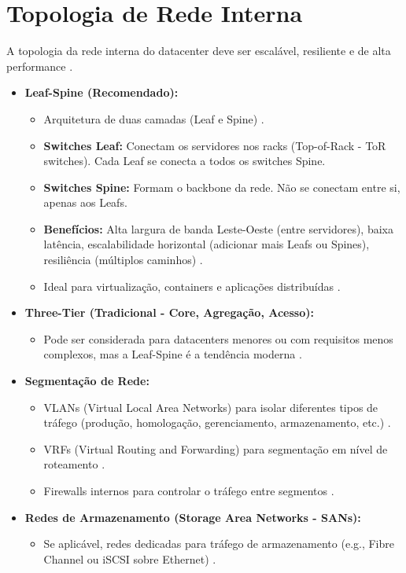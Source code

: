 \documentclass[
	12pt,				%
	oneside,			%
	a4paper,			%
	english,			%
	brazil				%
	]{abntex2unama}
\begin{document}
\section{Topologia de Rede Interna}
A topologia da rede interna do datacenter deve ser escalável, resiliente e de alta performance \cite{datacenter_networking}.
\begin{itemize}
	\item \textbf{Leaf-Spine (Recomendado):}
	      \begin{itemize}
		      \item Arquitetura de duas camadas (Leaf e Spine) \cite{network_fabric}.
		      \item \textbf{Switches Leaf:} Conectam os servidores nos racks (Top-of-Rack - ToR switches). Cada Leaf se conecta a todos os switches Spine.
		      \item \textbf{Switches Spine:} Formam o backbone da rede. Não se conectam entre si, apenas aos Leafs.
		      \item \textbf{Benefícios:} Alta largura de banda Leste-Oeste (entre servidores), baixa latência, escalabilidade horizontal (adicionar mais Leafs ou Spines), resiliência (múltiplos caminhos) \cite{hyperscale_datacenters}.
		      \item Ideal para virtualização, containers e aplicações distribuídas \cite{containerization}.
	      \end{itemize}
	\item \textbf{Three-Tier (Tradicional - Core, Agregação, Acesso):}
	      \begin{itemize}
		      \item Pode ser considerada para datacenters menores ou com requisitos menos complexos, mas a Leaf-Spine é a tendência moderna \cite{network_fabric}.
	      \end{itemize}
	\item \textbf{Segmentação de Rede:}
	      \begin{itemize}
		      \item VLANs (Virtual Local Area Networks) para isolar diferentes tipos de tráfego (produção, homologação, gerenciamento, armazenamento, etc.) \cite{datacenter_security}.
		      \item VRFs (Virtual Routing and Forwarding) para segmentação em nível de roteamento \cite{network_fabric}.
		      \item Firewalls internos para controlar o tráfego entre segmentos \cite{datacenter_security}.
	      \end{itemize}
	\item \textbf{Redes de Armazenamento (Storage Area Networks - SANs):}
	      \begin{itemize}
		      \item Se aplicável, redes dedicadas para tráfego de armazenamento (e.g., Fibre Channel ou iSCSI sobre Ethernet) \cite{dcim_systems}.
	      \end{itemize}
\end{itemize}
\end{document}
